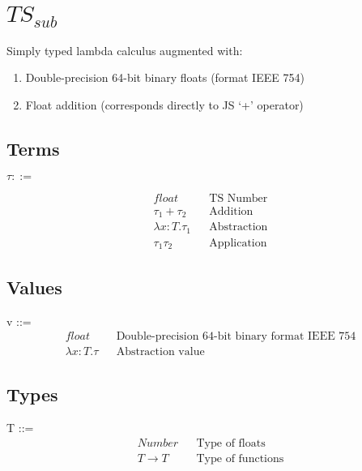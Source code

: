 \documentclass{article}
\begin{document}
	
	\tableofcontents
	\pagebreak
	
	\section{$TS_{sub}$}
	
	Simply typed lambda calculus augmented with:
	\begin{enumerate}
		\item Double-precision 64-bit binary floats (format IEEE 754)
		\item Float addition (corresponds directly to JS `+' operator)
	\end{enumerate}
	
	\subsection{Terms}
	$\tau ::=$
	
	\begin{align*}
		float  										&& \text{TS Number} \\
		\tau_1 + \tau_2 							&& \text{Addition} \\
		\lambda x:T.\tau_1							&& \text{Abstraction} \\
		\tau_1 \tau_2								&& \text{Application}
	\end{align*}


	\subsection{Values}
	v ::=
	\begin{align*}
		float										&& \text{Double-precision 64-bit binary format IEEE 754} \\
		\lambda x:T.\tau							&& \text{Abstraction value}
	\end{align*}
	
	
	\subsection{Types}
	T ::=
	\begin{align*}
		Number												&& \text{Type of floats}\\
		T \rightarrow T										&& \text{Type of functions}
	\end{align*}
	
\end{document}
